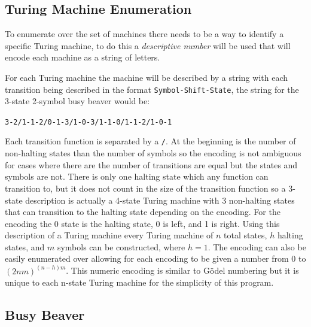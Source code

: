 \documentclass[journal,12pt,onecolumn,draftclsnofoot,]{IEEEtran}
\begin{document}
\subsection{Turing Machine Enumeration}

To enumerate over the set of machines there needs to be a way to identify a specific
Turing machine, to do this a \textit{descriptive number} will be used that will encode
each machine as a string of letters.~\cite{computable_numbers}

For each Turing machine the machine will be described by a string with each transition being
described in the format \verb|Symbol-Shift-State|, the string for the 3-state 
2-symbol 
busy beaver would be: 

\begin{center}
  {\verb|3-2/1-1-2/0-1-3/1-0-3/1-1-0/1-1-2/1-0-1|}
\end{center}

Each transition 
function is separated by a \verb|/|. At the beginning is the number of non-halting states than the number
of symbols so the encoding is not ambiguous for cases where there are the number of transitions
are equal but the states and symbols are not. There is only one halting 
state which any function can transition to, but it does not count in the size of the transition
function so a 3-state description is actually a 4-state Turing machine with 3 non-halting
states that can transition to the halting state depending on the encoding. For the encoding
the 0 state is the halting state, 0 is left, and 1 is right. Using this description of a 
Turing machine every Turing machine of $n$ total states, $h$ halting states, and $m$ symbols
can be constructed, where $h = 1$. The encoding can also be easily enumerated over allowing 
for each encoding to be given a number from 0 to ${(2nm)}^{(n-h)m}$. This numeric encoding
is similar to Gödel numbering but it is unique to each n-state Turing machine for the 
simplicity of this program.

\subsection{Busy Beaver}
\end{document}
